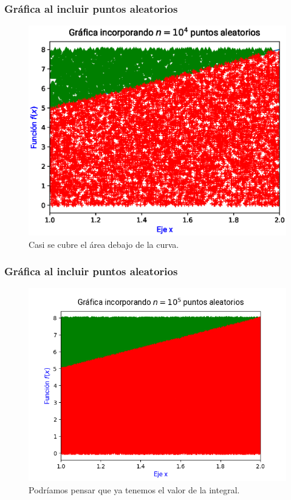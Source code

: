 \begin{frame}
\frametitle{Gráfica al incluir puntos aleatorios}
\begin{figure}
    \centering
    \includegraphics[scale=0.55]{Imagenes/area_puntos_04.eps}
    \caption{Casi se cubre el área debajo de la curva.}
\end{figure}
\end{frame}
\begin{frame}
\frametitle{Gráfica al incluir puntos aleatorios}
\begin{figure}
    \centering
    \includegraphics[scale=0.55]{Imagenes/area_puntos_05.png}
    \caption{Podríamos pensar que ya tenemos el valor de la integral.}
\end{figure}
\end{frame}
